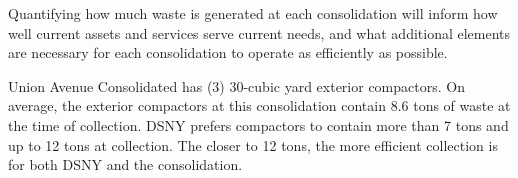 
    Quantifying how much waste is generated at each consolidation will inform how well current assets and services serve current needs, and what additional elements are necessary for each consolidation to operate as efficiently as possible.
    
    Union Avenue Consolidated has (3) 30-cubic yard exterior compactors. On average, the exterior compactors at this consolidation contain 8.6 tons of waste at the time of collection. DSNY prefers compactors to contain more than 7 tons and up to 12 tons at collection. The closer to 12 tons, the more efficient collection is for both DSNY and the consolidation.